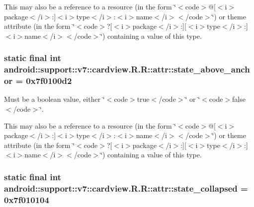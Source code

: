 This may also be a reference to a resource (in the form \char`\"{}$<$code$>$@\mbox{[}$<$i$>$package$<$/i$>$:\mbox{]}$<$i$>$type$<$/i$>$:$<$i$>$name$<$/i$>$$<$/code$>$\char`\"{}) or theme attribute (in the form \char`\"{}$<$code$>$?\mbox{[}$<$i$>$package$<$/i$>$:\mbox{]}\mbox{[}$<$i$>$type$<$/i$>$:\mbox{]}$<$i$>$name$<$/i$>$$<$/code$>$\char`\"{}) containing a value of this type. \hypertarget{classandroid_1_1support_1_1v7_1_1cardview_1_1_r_1_1attr_02b716646ecebe49b28956550bbf477f}{
\subsubsection[{state\_\-above\_\-anchor}]{\setlength{\rightskip}{0pt plus 5cm}static final int android::support::v7::cardview.R.R::attr::state\_\-above\_\-anchor = 0x7f0100d2}}
\label{classandroid_1_1support_1_1v7_1_1cardview_1_1_r_1_1attr_02b716646ecebe49b28956550bbf477f}


Must be a boolean value, either \char`\"{}$<$code$>$true$<$/code$>$\char`\"{} or \char`\"{}$<$code$>$false$<$/code$>$\char`\"{}. 

This may also be a reference to a resource (in the form \char`\"{}$<$code$>$@\mbox{[}$<$i$>$package$<$/i$>$:\mbox{]}$<$i$>$type$<$/i$>$:$<$i$>$name$<$/i$>$$<$/code$>$\char`\"{}) or theme attribute (in the form \char`\"{}$<$code$>$?\mbox{[}$<$i$>$package$<$/i$>$:\mbox{]}\mbox{[}$<$i$>$type$<$/i$>$:\mbox{]}$<$i$>$name$<$/i$>$$<$/code$>$\char`\"{}) containing a value of this type. \hypertarget{classandroid_1_1support_1_1v7_1_1cardview_1_1_r_1_1attr_7c4b4862cd93c6568efaceedd20e842a}{
\subsubsection[{state\_\-collapsed}]{\setlength{\rightskip}{0pt plus 5cm}static final int android::support::v7::cardview.R.R::attr::state\_\-collapsed = 0x7f010104}}
\label{classandroid_1_1support_1_1v7_1_1cardview_1_1_r_1_1attr_7c4b4862cd93c6568efaceedd20e842a}


